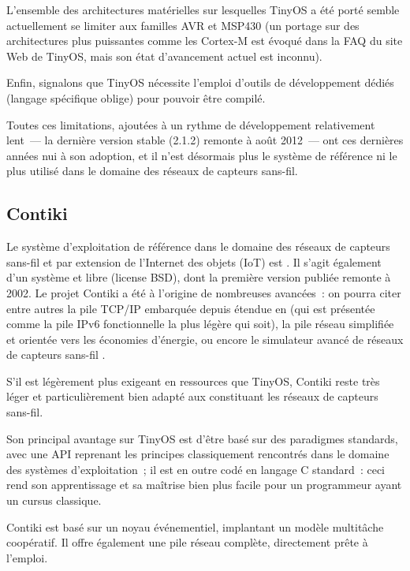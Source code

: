 L'ensemble des architectures matérielles sur lesquelles TinyOS a été porté
semble actuellement se limiter aux familles AVR et MSP430 (un portage sur
des architectures plus puissantes comme les Cortex-M est évoqué dans la
FAQ du site Web de TinyOS, mais son état d'avancement actuel est inconnu).

Enfin, signalons que TinyOS nécessite l'emploi d'outils de développement
dédiés (langage spécifique oblige) pour pouvoir être compilé.

Toutes ces limitations, ajoutées à un rythme de développement relativement
lent~--- la dernière version stable (2.1.2) remonte à août 2012~--- ont
ces dernières années nui à son adoption, et il n'est désormais plus
le système de référence ni le plus utilisé dans le domaine des réseaux
de capteurs sans-fil.


\subsection{Contiki}
\label{SubsecContikiOS}

Le système d'exploitation de référence dans le domaine des réseaux de
capteurs sans-fil et par extension de l'Internet des objets (IoT) est
 \cite{ContikiOS}. Il s'agit également d'un système
 et libre (license BSD), dont la première version
publiée remonte à 2002. Le projet Contiki a été à l'origine de nombreuses
avancées~: on pourra citer entre autres la pile TCP/IP embarquée 
\cite{uip} depuis étendue en  (qui est présentée comme la pile
IPv6 fonctionnelle la plus légère qui soit), la pile réseau 
\cite{Rime} simplifiée et orientée vers les économies d'énergie,
ou encore le simulateur avancé de réseaux de capteurs sans-fil
 \cite{Cooja}.

S'il est légèrement plus exigeant en ressources que TinyOS, Contiki
reste très léger et particulièrement bien adapté aux 
constituant les réseaux de capteurs sans-fil.

Son principal avantage sur TinyOS est d'être basé sur des paradigmes
standards, avec une API reprenant les principes classiquement rencontrés
dans le domaine des systèmes d'exploitation~; il est en outre codé en
langage C standard~: ceci rend son apprentissage et sa maîtrise bien plus
facile pour un programmeur ayant un cursus classique.

Contiki est basé sur un noyau événementiel, implantant un modèle
multitâche coopératif. Il offre également une pile réseau complète,
directement prête à l'emploi.

